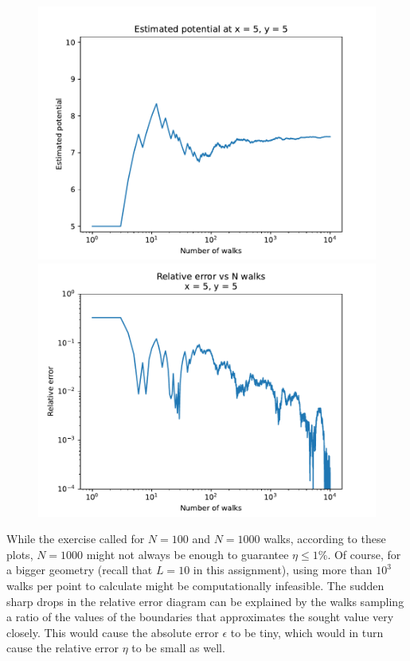 \documentclass[a4paper,12pt]{article}
\begin{document}
\begin{figure}[!ht]
  \centering
  \begin{minipage}{0.49\textwidth}
    \includegraphics[width=\textwidth]{img/4_3a_V55.pdf}
  \end{minipage}
  \begin{minipage}{0.49\textwidth}
    \includegraphics[width=\textwidth]{img/4_3a_E55.pdf}
  \end{minipage}
\end{figure}

While the exercise called for $N = 100$ and $N = 1000$ walks, according to these plots, $N = 1000$ might not always
be enough to guarantee $\eta \leq 1\%$. Of course, for a bigger geometry (recall that $L = 10$ in this assignment),
using more than $10^3$ walks per point to calculate might be computationally infeasible. The sudden sharp drops in
the relative error diagram can be explained by the walks sampling a ratio of the values of the boundaries that
approximates the sought value very closely. This would cause the absolute error $\epsilon$ to be tiny, which would in
turn cause the relative error $\eta$ to be small as well.
\end{document}
